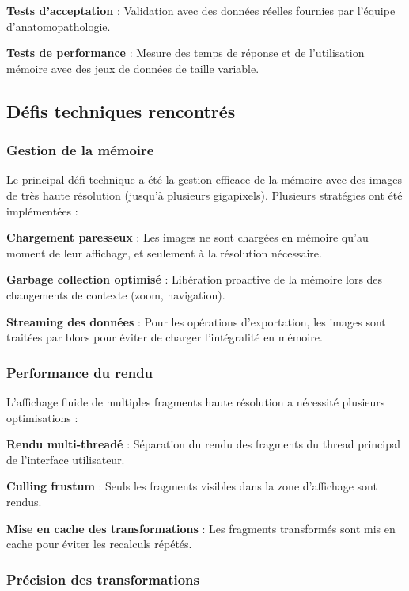 \documentclass[12pt,a4paper]{report}
\begin{document}
\begin{}
\begin{}
\begin{}
\begin{}
\textbf{Tests d'acceptation} : Validation avec des données réelles fournies par l'équipe d'anatomopathologie.

\textbf{Tests de performance} : Mesure des temps de réponse et de l'utilisation mémoire avec des jeux de données de taille variable.

\subsection{Défis techniques rencontrés}

\subsubsection{Gestion de la mémoire}

Le principal défi technique a été la gestion efficace de la mémoire avec des images de très haute résolution (jusqu'à plusieurs gigapixels). Plusieurs stratégies ont été implémentées :

\textbf{Chargement paresseux} : Les images ne sont chargées en mémoire qu'au moment de leur affichage, et seulement à la résolution nécessaire.

\textbf{Garbage collection optimisé} : Libération proactive de la mémoire lors des changements de contexte (zoom, navigation).

\textbf{Streaming des données} : Pour les opérations d'exportation, les images sont traitées par blocs pour éviter de charger l'intégralité en mémoire.

\subsubsection{Performance du rendu}

L'affichage fluide de multiples fragments haute résolution a nécessité plusieurs optimisations :

\textbf{Rendu multi-threadé} : Séparation du rendu des fragments du thread principal de l'interface utilisateur.

\textbf{Culling frustum} : Seuls les fragments visibles dans la zone d'affichage sont rendus.

\textbf{Mise en cache des transformations} : Les fragments transformés sont mis en cache pour éviter les recalculs répétés.

\subsubsection{Précision des transformations}


\end{}
\end{}
\end{}
\end{}
\end{document}

